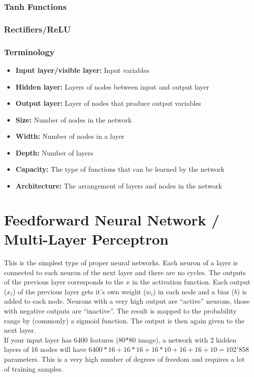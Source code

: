 \documentclass[
]{book}
\begin{document}
\hypertarget{tanh-functions}{%
\subsubsection{Tanh Functions}\label{tanh-functions}}

\hypertarget{rectifiersrelu}{%
\subsubsection{Rectifiers/ReLU}\label{rectifiersrelu}}

\hypertarget{terminology-1}{%
\subsubsection{Terminology}\label{terminology-1}}

\begin{itemize}
\item
  \textbf{Input layer/visible layer:} Input variables
\item
  \textbf{Hidden layer:} Layers of nodes between input and output layer
\item
  \textbf{Output layer:} Layer of nodes that produce output variables
\item
  \textbf{Size:} Number of nodes in the network
\item
  \textbf{Width:} Number of nodes in a layer
\item
  \textbf{Depth:} Number of layers
\item
  \textbf{Capacity:} The type of functions that can be learned by the
  network
\item
  \textbf{Architecture:} The arrangement of layers and nodes in the network
\end{itemize}

\hypertarget{feedforward-neural-network-multi-layer-perceptron}{%
\section{Feedforward Neural Network / Multi-Layer Perceptron}\label{feedforward-neural-network-multi-layer-perceptron}}

This is the simplest type of proper neural networks. Each neuron of a
layer is connected to each neuron of the next layer and there are no
cycles. The outputs of the previous layer corresponds to the \(x\) in the
activation function. Each output (\(x_i\)) of the previous layer gets it's
own weight (\(w_i\)) in each node and a bias (\(b\)) is added to each node.
Neurons with a very high output are ``active'' neurons, those with
negative outputs are ``inactive''. The result is mapped to the probability
range by (commonly) a sigmoid function. The output is then again given
to the next layer.\\
If your input layer has 6400 features (80*80 image), a network with 2
hidden layers of 16 nodes will have
\(6400*16+16*16+16*10+16+16+10 = 102'858\) parameters. This is a very high
number of degrees of freedom and requires a lot of training samples.
\end{document}

